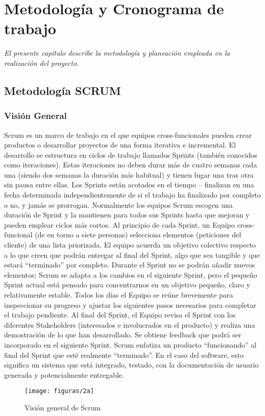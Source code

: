 \chapter{Metodología y Cronograma de trabajo}
\label{chap:metodologia}
\textit{El presente capítulo describe la metodología y planeación empleada en la realización del proyecto.}
\vfill
\minitoc
\newpage

\section{Metodología SCRUM}
\subsection{Visión General}
Scrum es un marco de trabajo en el que equipos cross-funcionales pueden crear productos o desarrollar proyectos de una forma iterativa e incremental. El desarrollo se estructura en ciclos de trabajo llamados Sprints (también conocidos como iteraciones). Estas iteraciones no deben durar más de cuatro semanas cada una (siendo dos semanas la duración más habitual) y tienen lugar una tras otra sin pausa entre ellas. Los Sprints están acotados en el tiempo – finalizan en una fecha determinada independientemente de si el trabajo ha finalizado por completo o no, y jamás se prorrogan. Normalmente los equipos Scrum escogen una duración de Sprint y la mantienen para todos sus Sprints hasta que mejoran y pueden emplear ciclos más cortos. Al principio de cada Sprint, un Equipo cross-funcional (de en torno a siete personas) selecciona elementos (peticiones del cliente) de una lista priorizada. El equipo acuerda un objetivo colectivo respecto a lo que creen que podrán entregar al final del Sprint, algo que sea tangible y que estará “terminado” por completo. Durante el Sprint no se podrán añadir nuevos elementos; Scrum se adapta a los cambios en el siguiente Sprint, pero el pequeño Sprint actual está pensado para concentrarnos en un objetivo pequeño, claro y relativamente estable. Todos los días el Equipo se reúne brevemente para inspeccionar su progreso y ajustar los siguientes pasos necesarios para completar el trabajo pendiente. Al final del Sprint, el Equipo revisa el Sprint con los diferentes Stakeholders (interesados e involucrados en el producto) y realiza una demostración de lo que han desarrollado. Se obtiene feedback que podrá ser incorporado en el siguiente Sprint. Scrum enfatiza un producto “funcionando” al final del Sprint que esté realmente “terminado”. En el caso del software, esto significa un sistema que está integrado, testado, con la documentación de usuario generada y potencialmente entregable. \cite{ref2}
  \begin{figure}[H]
  	\centering
  	\texttt{[image: figuras/2a]}
  	\captionsetup{width=.95\textwidth}
  	\caption{Visión general de Scrum \cite{ref2}}
  	\label{figura2a}
  \end{figure}


